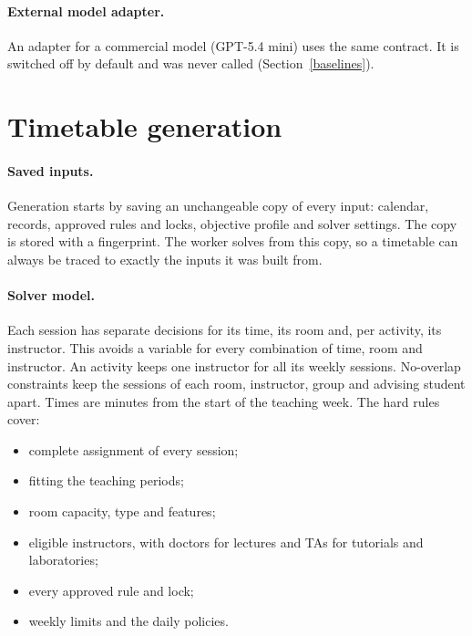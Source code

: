 \paragraph{External model adapter.} An adapter for a commercial model (GPT-5.4 mini) uses the same contract. It is switched off by default and was never called (Section~\ref{baselines}).

\section{Timetable generation}

\paragraph{Saved inputs.} Generation starts by saving an unchangeable copy of every input: calendar, records, approved rules and locks, objective profile and solver settings. The copy is stored with a fingerprint. The worker solves from this copy, so a timetable can always be traced to exactly the inputs it was built from.

\paragraph{Solver model.} Each session has separate decisions for its time, its room and, per activity, its instructor. This avoids a variable for every combination of time, room and instructor. An activity keeps one instructor for all its weekly sessions. No-overlap constraints keep the sessions of each room, instructor, group and advising student apart. Times are minutes from the start of the teaching week. The hard rules cover:
\begin{itemize}
\item complete assignment of every session;
\item fitting the teaching periods;
\item room capacity, type and features;
\item eligible instructors, with doctors for lectures and TAs for tutorials and laboratories;
\item every approved rule and lock;
\item weekly limits and the daily policies.
\end{itemize}

